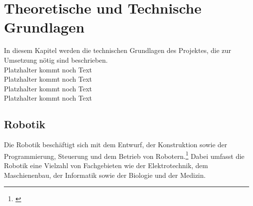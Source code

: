 \section{Theoretische und Technische Grundlagen}
In diesem Kapitel werden die technischen Grundlagen des Projektes, die zur Umsetzung nötig sind beschrieben.
\\Platzhalter kommt noch Text
\\Platzhalter kommt noch Text
\\Platzhalter kommt noch Text
\\Platzhalter kommt noch Text
\subsection{Robotik} %
\color{finishing}
Die Robotik beschäftigt sich mit dem Entwurf, der Konstruktion sowie der Programmierung, Steuerung und dem Betrieb 
von Robotern.\footnote{\citep[vgl.][Definition Robotik]{Bendel.DefinitionRobotik}\label{note1}} Dabei umfasst die Robotik eine Vielzahl 
von Fachgebieten wie der Elektrotechnik, dem Maschienenbau, der Informatik sowie der Biologie und der Medizin.
